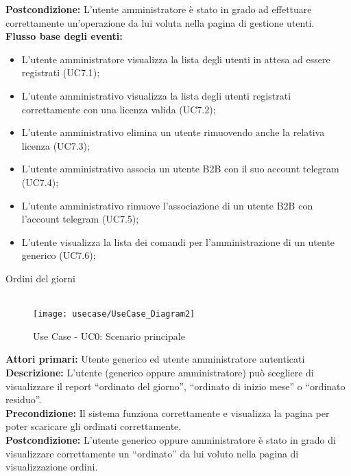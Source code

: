 \textbf{Postcondizione:}  L’utente amministratore è stato in grado ad effettuare correttamente  un’operazione da lui voluta nella pagina di gestione utenti.\\


\textbf{Flusso base degli eventi:} 

\begin{itemize}

\item L’utente amministratore visualizza la lista degli utenti in attesa ad essere registrati (UC7.1);
\item L’utente amministrativo visualizza la lista degli utenti registrati correttamente con una licenza valida (UC7.2);
\item L’utente amministrativo elimina un utente rimuovendo anche la relativa licenza (UC7.3);
\item L’utente amministrativo associa un utente B2B con il suo account telegram (UC7.4);
\item L’utente amministrativo rimuove l’associazione di un utente B2B con l’account telegram (UC7.5);
\item L’utente visualizza la lista dei comandi per l’amministrazione di un utente generico (UC7.6);


\end{itemize}  



Ordini del giorni \\\\

\begin{figure}[!h] 
    \centering 
    \texttt{[image: usecase/UseCase\_Diagram2]} 
    \caption{Use Case - UC0: Scenario principale}
\end{figure} 

\textbf{Attori primari:} Utente generico ed utente amministratore autenticati
\\


\textbf{Descrizione:} L’utente (generico oppure amministratore) può scegliere di visualizzare il report “ordinato del giorno”, “ordinato di inizio mese” o “ordinato residuo”. \\

\textbf{Precondizione:} Il sistema funziona correttamente e visualizza la pagina per poter scaricare gli ordinati correttamente. \\

\textbf{Postcondizione:}  L’utente generico oppure amministratore è stato in grado di visualizzare correttamente  un “ordinato” da lui voluto nella pagina di visualizzazione ordini. \\



